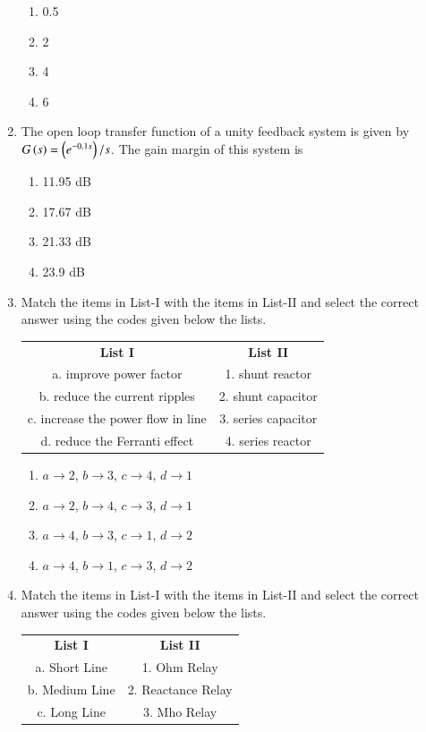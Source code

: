 \documentclass[journal]{IEEEtran}
\numberwithin{equation}{enumi}
\numberwithin{figure}{enumi}
\begin{document}
\begin{enumerate}[start=25]
\begin{figure}[!ht]
    \caption{}
    \end{figure}
\begin{enumerate}
\item 0.5
\item 2
\item 4
\item 6
\end{enumerate}
\newpage
\item The open loop transfer function of a unity feedback system is given by $G\left(s\right)=\left(e^{-0.1s}\right)/s$. The gain margin of this system is
\begin{enumerate}
\item 11.95 dB
\item 17.67 dB
\item 21.33 dB
\item 23.9 dB
\end{enumerate}
\item Match the items in List-I with the items in List-II and select the correct answer using the codes given below the lists.

\begin{tabular}{c c}
\textbf{List I} & \textbf{List II} \\
a. improve power factor & 1. shunt reactor \\
b. reduce the current ripples & 2. shunt capacitor \\
c. increase the power flow in line & 3. series capacitor \\
d. reduce the Ferranti effect & 4. series reactor \\
\end{tabular}

\begin{enumerate}
\item $a \rightarrow 2$, $b \rightarrow 3$, $c \rightarrow 4$, $d \rightarrow 1$
\item $a \rightarrow 2$, $b \rightarrow 4$, $c \rightarrow 3$, $d \rightarrow 1$
\item $a \rightarrow 4$, $b \rightarrow 3$, $c \rightarrow 1$, $d \rightarrow 2$
\item $a \rightarrow 4$, $b \rightarrow 1$, $c \rightarrow 3$, $d \rightarrow 2$
\end{enumerate}
\item Match the items in List-I with the items in List-II and select the correct answer using the codes given below the lists.

\begin{tabular}{c c}
\textbf{List I} & \textbf{List II} \\
a. Short Line & 1. Ohm Relay \\
b. Medium Line & 2. Reactance Relay \\
c. Long Line & 3. Mho Relay \\
\end{tabular}


\end{enumerate}
\end{document}
